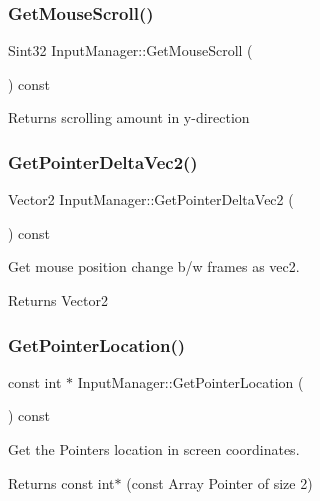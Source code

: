 \subsubsection{\texorpdfstring{Get\+Mouse\+Scroll()}{GetMouseScroll()}}
{\footnotesize\ttfamily Sint32 Input\+Manager\+::\+Get\+Mouse\+Scroll (\begin{DoxyParamCaption}{ }\end{DoxyParamCaption}) const}

Returns scrolling amount in y-\/direction \mbox{\label{classInputManager_a48091a18d5c514a1dc8226aa4b134b4d}} 
\subsubsection{\texorpdfstring{Get\+Pointer\+Delta\+Vec2()}{GetPointerDeltaVec2()}}
{\footnotesize\ttfamily Vector2 Input\+Manager\+::\+Get\+Pointer\+Delta\+Vec2 (\begin{DoxyParamCaption}{ }\end{DoxyParamCaption}) const}



Get mouse position change b/w frames as vec2. 

\begin{DoxyReturn}{Returns}
Vector2 
\end{DoxyReturn}
\mbox{\label{classInputManager_ab8fb90f6385afb41d9d8212851c04061}} 
\subsubsection{\texorpdfstring{Get\+Pointer\+Location()}{GetPointerLocation()}}
{\footnotesize\ttfamily const int $\ast$ Input\+Manager\+::\+Get\+Pointer\+Location (\begin{DoxyParamCaption}{ }\end{DoxyParamCaption}) const}



Get the Pointer\textquotesingle{}s location in screen coordinates. 

\begin{DoxyReturn}{Returns}
const int$\ast$ (const Array Pointer of size 2) 
\end{DoxyReturn}
\mbox{\label{classInputManager_a6d5e2b6637bb959377f218bb4b3d748e}} 
